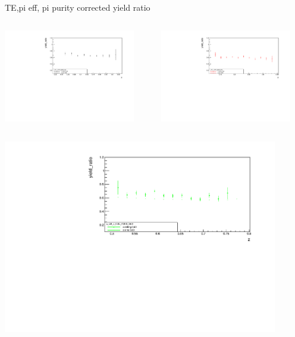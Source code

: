 \begin{frame}{TE,pi eff, pi purity corrected yield ratio}
\begin{columns}
\begin{column}[T]{0.5\textwidth}
\includegraphics[width = 0.9\textwidth]{results/yield/statistics_corr/x_Q2_z_35_4000_40_ratio.pdf}
\end{column}
\begin{column}[T]{0.5\textwidth}
\includegraphics[width = 0.9\textwidth]{results/yield/statistics_corr/x_Q2_z_35_4000_50_ratio.pdf}
\end{column}
\end{columns}
\begin{columns}
\begin{column}[T]{0.5\textwidth}
\includegraphics[width = 0.9\textwidth]{results/yield/statistics_corr/x_Q2_z_35_4000_60_ratio.pdf}

\end{column}
\end{columns}
\end{frame}
